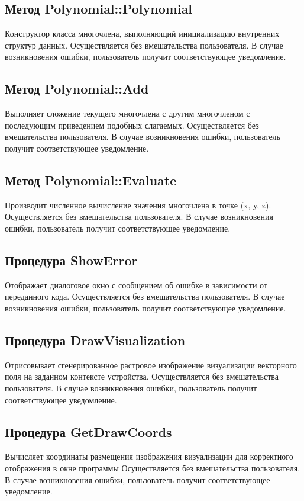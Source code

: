 \documentclass[14pt,a4paper,final]{extreport}
\begin{document}
\subsection{Метод Polynomial::Polynomial}
Конструктор класса многочлена, выполняющий инициализацию внутренних структур данных. Осуществляется без вмешательства пользователя. 
В случае возникновения ошибки, пользователь получит соответствующее уведомление.

\subsection{Метод Polynomial::Add}
Выполняет сложение текущего многочлена с другим многочленом с последующим приведением подобных слагаемых. Осуществляется без вмешательства пользователя. 
В случае возникновения ошибки, пользователь получит соответствующее уведомление.

\subsection{Метод Polynomial::Evaluate}
Производит численное вычисление значения многочлена в точке (x, y, z). Осуществляется без вмешательства пользователя. 
В случае возникновения ошибки, пользователь получит соответствующее уведомление.

\subsection{Процедура ShowError}
Отображает диалоговое окно с сообщением об ошибке в зависимости от переданного кода. Осуществляется без вмешательства пользователя. 
В случае возникновения ошибки, пользователь получит соответствующее уведомление.

\subsection{Процедура DrawVisualization}
Отрисовывает сгенерированное растровое изображение визуализации векторного поля на заданном контексте устройства. Осуществляется без вмешательства пользователя. 
В случае возникновения ошибки, пользователь получит соответствующее уведомление.

\subsection{Процедура GetDrawCoords}
Вычисляет координаты размещения изображения визуализации для корректного отображения в окне программы Осуществляется без вмешательства пользователя. 
В случае возникновения ошибки, пользователь получит соответствующее уведомление.
\end{document}
